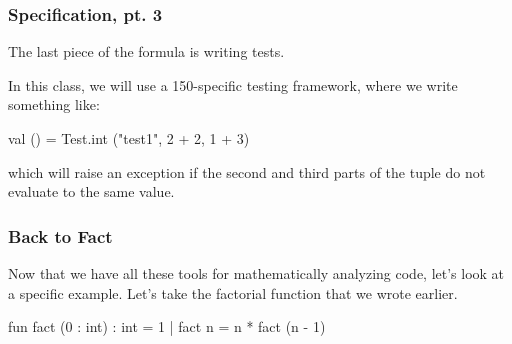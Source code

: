 \documentclass[aspectratio=169]{beamer}
\begin{document}
\begin{frame}[fragile]
  \frametitle{Specification, pt. 3}

  The last piece of the formula is writing tests.\footnotemark

  \pause
  \vspace{\fill}

  In this class, we will use a 150-specific testing framework, where
  we write something like:
  
  \begin{codeblock}
    val () = Test.int ("test1", 2 + 2, 1 + 3)
  \end{codeblock}
  which will raise an exception if the second and third parts of the
  tuple do not evaluate to the same value.

  \vspace{\fill}



\end{frame}

\begin{frame}[fragile]
  \frametitle{Back to Fact}

  Now that we have all these tools for mathematically analyzing
  code, let's look at a specific example. Let's take the factorial 
  function that we wrote earlier.

  \vspace{\fill}

  \begin{codeblock}
    fun fact (0 : int) : int = 1
      | fact n = n * fact (n - 1)
  \end{codeblock}

  \pause
  \vspace{\fill}

\end{frame}
\end{document}
